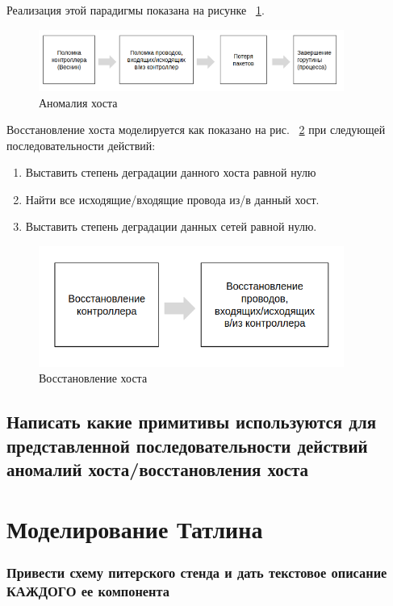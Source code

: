 Реализация этой парадигмы показана на рисунке ~\ref{fig:anom-host}.

\begin{figure}[!ht]
\centering
\includegraphics[width=10cm]{Kenenbek/images/anom-scheme-host.png}
\caption{Аномалия хоста}
\label{fig:anom-host}
\end{figure}

Восстановление хоста моделируется как показано на рис. ~\ref{fig:repai-host} при следующей последовательности действий:

\begin{enumerate}
\item Выставить степень деградации данного хоста равной нулю
\item Найти все исходящие/входящие провода из/в данный хост.
\item Выставить степень деградации данных сетей равной нулю.
\end{enumerate}

\begin{figure}[!ht]
\centering
\includegraphics[width=10cm]{Kenenbek/images/repair-host.png}
\caption{Восстановление хоста}
\label{fig:repai-host}
\end{figure}

\subsection{Написать какие примитивы используются для представленной последовательности действий аномалий хоста/восстановления хоста}


\section{Моделирование Татлина}\label{Tatlin}
\subsubsection{Привести схему питерского стенда и дать текстовое описание КАЖДОГО ее компонента}

